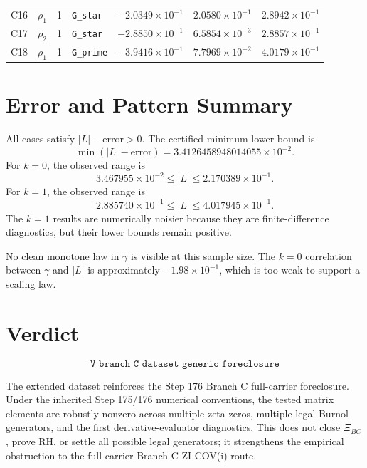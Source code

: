 \documentclass[11pt]{article}
\begin{document}
\begin{center}
\begin{tabular}{llllrrr}
C16 & \(\rho_1\) & 1 & \texttt{G\_star} & \(-2.0349{\times}10^{-1}\) & \(2.0580{\times}10^{-1}\) & \(2.8942{\times}10^{-1}\)\\
C17 & \(\rho_2\) & 1 & \texttt{G\_star} & \(-2.8850{\times}10^{-1}\) & \(6.5854{\times}10^{-3}\) & \(2.8857{\times}10^{-1}\)\\
C18 & \(\rho_1\) & 1 & \texttt{G\_prime} & \(-3.9416{\times}10^{-1}\) & \(7.7969{\times}10^{-2}\) & \(4.0179{\times}10^{-1}\)\\
\bottomrule
\end{tabular}
\end{center}

\section*{Error and Pattern Summary}

All cases satisfy \(|L|-\mathrm{error}>0\).  The certified minimum lower bound is
\[
  \min(|L|-\mathrm{error})=3.4126458948014055\times 10^{-2}.
\]
For \(k=0\), the observed range is
\[
  3.467955\times 10^{-2}\le |L|\le 2.170389\times 10^{-1}.
\]
For \(k=1\), the observed range is
\[
  2.885740\times 10^{-1}\le |L|\le 4.017945\times 10^{-1}.
\]
The \(k=1\) results are numerically noisier because they are finite-difference diagnostics, but their lower bounds remain positive.

No clean monotone law in \(\gamma\) is visible at this sample size.  The \(k=0\) correlation between \(\gamma\) and \(|L|\) is approximately \(-1.98\times 10^{-1}\), which is too weak to support a scaling law.

\section*{Verdict}

\[
\boxed{\texttt{V\_branch\_C\_dataset\_generic\_foreclosure}}
\]

The extended dataset reinforces the Step 176 Branch C full-carrier foreclosure.  Under the inherited Step 175/176 numerical conventions, the tested matrix elements are robustly nonzero across multiple zeta zeros, multiple legal Burnol generators, and the first derivative-evaluator diagnostics.  This does not close \(\Xi_{BC}\), prove RH, or settle all possible legal generators; it strengthens the empirical obstruction to the full-carrier Branch C ZI-COV(i) route.
\end{document}
